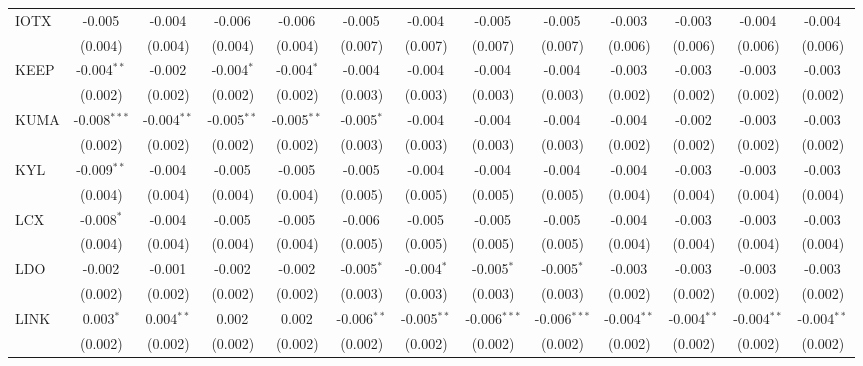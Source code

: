 \begin{table}[!htbp]
\begin{tabular}{@{\extracolsep{5pt}}lcccccccccccc}
 IOTX & -0.005$^{}$ & -0.004$^{}$ & -0.006$^{}$ & -0.006$^{}$ & -0.005$^{}$ & -0.004$^{}$ & -0.005$^{}$ & -0.005$^{}$ & -0.003$^{}$ & -0.003$^{}$ & -0.004$^{}$ & -0.004$^{}$ \\
  & (0.004) & (0.004) & (0.004) & (0.004) & (0.007) & (0.007) & (0.007) & (0.007) & (0.006) & (0.006) & (0.006) & (0.006) \\
 KEEP & -0.004$^{**}$ & -0.002$^{}$ & -0.004$^{*}$ & -0.004$^{*}$ & -0.004$^{}$ & -0.004$^{}$ & -0.004$^{}$ & -0.004$^{}$ & -0.003$^{}$ & -0.003$^{}$ & -0.003$^{}$ & -0.003$^{}$ \\
  & (0.002) & (0.002) & (0.002) & (0.002) & (0.003) & (0.003) & (0.003) & (0.003) & (0.002) & (0.002) & (0.002) & (0.002) \\
 KUMA & -0.008$^{***}$ & -0.004$^{**}$ & -0.005$^{**}$ & -0.005$^{**}$ & -0.005$^{*}$ & -0.004$^{}$ & -0.004$^{}$ & -0.004$^{}$ & -0.004$^{}$ & -0.002$^{}$ & -0.003$^{}$ & -0.003$^{}$ \\
  & (0.002) & (0.002) & (0.002) & (0.002) & (0.003) & (0.003) & (0.003) & (0.003) & (0.002) & (0.002) & (0.002) & (0.002) \\
 KYL & -0.009$^{**}$ & -0.004$^{}$ & -0.005$^{}$ & -0.005$^{}$ & -0.005$^{}$ & -0.004$^{}$ & -0.004$^{}$ & -0.004$^{}$ & -0.004$^{}$ & -0.003$^{}$ & -0.003$^{}$ & -0.003$^{}$ \\
  & (0.004) & (0.004) & (0.004) & (0.004) & (0.005) & (0.005) & (0.005) & (0.005) & (0.004) & (0.004) & (0.004) & (0.004) \\
 LCX & -0.008$^{*}$ & -0.004$^{}$ & -0.005$^{}$ & -0.005$^{}$ & -0.006$^{}$ & -0.005$^{}$ & -0.005$^{}$ & -0.005$^{}$ & -0.004$^{}$ & -0.003$^{}$ & -0.003$^{}$ & -0.003$^{}$ \\
  & (0.004) & (0.004) & (0.004) & (0.004) & (0.005) & (0.005) & (0.005) & (0.005) & (0.004) & (0.004) & (0.004) & (0.004) \\
 LDO & -0.002$^{}$ & -0.001$^{}$ & -0.002$^{}$ & -0.002$^{}$ & -0.005$^{*}$ & -0.004$^{*}$ & -0.005$^{*}$ & -0.005$^{*}$ & -0.003$^{}$ & -0.003$^{}$ & -0.003$^{}$ & -0.003$^{}$ \\
  & (0.002) & (0.002) & (0.002) & (0.002) & (0.003) & (0.003) & (0.003) & (0.003) & (0.002) & (0.002) & (0.002) & (0.002) \\
 LINK & 0.003$^{*}$ & 0.004$^{**}$ & 0.002$^{}$ & 0.002$^{}$ & -0.006$^{**}$ & -0.005$^{**}$ & -0.006$^{***}$ & -0.006$^{***}$ & -0.004$^{**}$ & -0.004$^{**}$ & -0.004$^{**}$ & -0.004$^{**}$ \\
  & (0.002) & (0.002) & (0.002) & (0.002) & (0.002) & (0.002) & (0.002) & (0.002) & (0.002) & (0.002) & (0.002) & (0.002) \\

\end{tabular}
\end{table}
